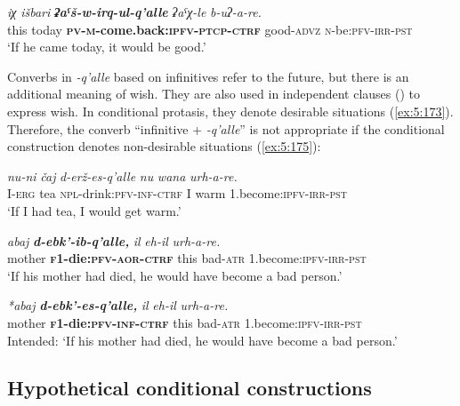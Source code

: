 ﻿\documentclass[output=paper]{langsci/langscibook}
\begin{document}
\ex %
\gll \emph{iχ} \emph{išbari} \emph{\textbf{ʡaˤš-w-irq-ul-q'alle}}  \emph{ʡaˤχ-le} \emph{b-uʔ-a-re.}\\
 this today \textbf{\textsc{pv}-\textsc{m}-come.back:\textsc{ipfv}-\textsc{ptcp}-\textsc{ctrf}} good-\textsc{advz} \textsc{n}-be:\textsc{pfv}-\textsc{irr}-\textsc{pst}\\
\glt `If he came today, it would be good.'
\z

Converbs in \emph{-q'alle} based on infinitives refer to the future, but
there is an additional meaning of wish. They are also used in
independent clauses () to express wish. In conditional
protasis, they denote desirable situations (\ref{ex:5:173}). Therefore, the converb
``infinitive + \emph{-q'alle}'' is not appropriate if the conditional
construction denotes non-desirable situations (\ref{ex:5:175}):

\ea \label{ex:5:173} %
\gll \emph{nu-ni} \emph{čaj} \emph{d-erž-es-q'alle} \emph{nu}  \emph{wana} \emph{urh-a-re.}\\
 I-\textsc{erg} tea \textsc{npl}-drink:\textsc{pfv}-\textsc{inf}-\textsc{ctrf} I warm 1.become:\textsc{ipfv}-\textsc{irr}-\textsc{pst}\\
\glt `If I had tea, I would get warm.'

\ex %
\gll \emph{abaj} \emph{\textbf{d-ebk'-ib-q'alle,}} \emph{il}  \emph{eh-il} \emph{urh-a-re.}\\
mother \textbf{\textsc{f1}-die:\textsc{pfv}-\textsc{aor}-\textsc{ctrf}} this bad-\textsc{atr} 1.become:\textsc{ipfv}-\textsc{irr}-\textsc{pst}\\
\glt `If his mother had died, he would have become a bad person.'

\ex \label{ex:5:175} %
\gll \emph{*abaj} \emph{\textbf{d-ebk'-es-q'alle,}} \emph{il} \emph{eh-il} \emph{urh-a-re.}\\
 mother \textbf{\textsc{f1}-die:\textsc{pfv}-\textsc{inf}-\textsc{ctrf}} this bad-\textsc{atr} 1.become:\textsc{ipfv}-\textsc{irr}-\textsc{pst}\\
\glt Intended: `If his mother had died, he would have become a bad person.'
\z

\removelastskip
{}

\subsection{Hypothetical conditional constructions}\label{hypothetical-conditional-constructions}
\end{document}
